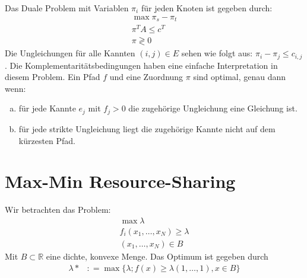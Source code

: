 Das Duale Problem mit Variablen $\pi_i$ für jeden Knoten ist gegeben durch:
\begin{align*}
\max \pi_s - \pi_t\\
\pi^T A  \leq c^T \\
\pi \gtrless 0
\end{align*}
Die Ungleichungen für alle Kannten $(i,j) \in E $ sehen wie folgt aus: $\pi_i - \pi_j \leq c_{i,j}$.
Die Komplementaritätsbedingungen haben eine einfache Interpretation in diesem Problem. 
Ein Pfad $f$ und eine Zuordnung $\pi$ sind optimal, genau dann wenn:
\begin{enumerate}[(a)]
\item für jede Kannte $e_j$ mit $f_j > 0$ die zugehörige Ungleichung eine Gleichung ist.
\item für jede strikte Ungleichung liegt die zugehörige Kannte nicht auf dem kürzesten Pfad.
\end{enumerate}


\section{Max-Min Resource-Sharing}
Wir betrachten das Problem:
\begin{align*}
\max \lambda \\
f_i ( x_1, \dotsc, x_N ) \geq \lambda \\
( x_1, \dotsc, x_N ) \in B
\end{align*}
Mit $B \subset \mathbb R$ eine dichte, konvexe Menge.
Das Optimum ist gegeben durch
\begin{align*}
\lambda* &\colon= \max \{\lambda ; f(x) \geq \lambda (1,\dotsc,1), x \in B \} 
\end{align*}



